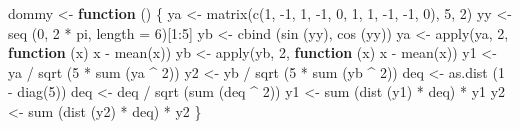 \documentclass[
  12pt,
]{book}
\newenvironment{Shaded}{\begin{snugshade}}{\end{snugshade}}
\newcommand{\AttributeTok}[1]{\textcolor[rgb]{0.77,0.63,0.00}{#1}}
\newcommand{\ControlFlowTok}[1]{\textcolor[rgb]{0.13,0.29,0.53}{\textbf{#1}}}
\newcommand{\DecValTok}[1]{\textcolor[rgb]{0.00,0.00,0.81}{#1}}
\newcommand{\FunctionTok}[1]{\textcolor[rgb]{0.00,0.00,0.00}{#1}}
\newcommand{\NormalTok}[1]{#1}
\newcommand{\OtherTok}[1]{\textcolor[rgb]{0.56,0.35,0.01}{#1}}
\newcommand{\SpecialCharTok}[1]{\textcolor[rgb]{0.00,0.00,0.00}{#1}}
\theoremstyle{definition}
\theoremstyle{definition}
\theoremstyle{definition}
\theoremstyle{definition}
\theoremstyle{remark}
\begin{document}
\begin{Shaded}
\begin{Highlighting}[]
\NormalTok{dommy }\OtherTok{\textless{}{-}} \ControlFlowTok{function}\NormalTok{ () \{}
\NormalTok{  ya }\OtherTok{\textless{}{-}} \FunctionTok{matrix}\NormalTok{(}\FunctionTok{c}\NormalTok{(}\DecValTok{1}\NormalTok{, }\SpecialCharTok{{-}}\DecValTok{1}\NormalTok{, }\DecValTok{1}\NormalTok{, }\SpecialCharTok{{-}}\DecValTok{1}\NormalTok{, }\DecValTok{0}\NormalTok{, }\DecValTok{1}\NormalTok{, }\DecValTok{1}\NormalTok{, }\SpecialCharTok{{-}}\DecValTok{1}\NormalTok{, }\SpecialCharTok{{-}}\DecValTok{1}\NormalTok{, }\DecValTok{0}\NormalTok{), }\DecValTok{5}\NormalTok{, }\DecValTok{2}\NormalTok{)}
\NormalTok{  yy }\OtherTok{\textless{}{-}} \FunctionTok{seq}\NormalTok{ (}\DecValTok{0}\NormalTok{, }\DecValTok{2} \SpecialCharTok{*}\NormalTok{ pi, }\AttributeTok{length =} \DecValTok{6}\NormalTok{)[}\DecValTok{1}\SpecialCharTok{:}\DecValTok{5}\NormalTok{]}
\NormalTok{  yb }\OtherTok{\textless{}{-}} \FunctionTok{cbind}\NormalTok{ (}\FunctionTok{sin}\NormalTok{ (yy), }\FunctionTok{cos}\NormalTok{ (yy))}
\NormalTok{  ya }\OtherTok{\textless{}{-}} \FunctionTok{apply}\NormalTok{(ya, }\DecValTok{2}\NormalTok{, }\ControlFlowTok{function}\NormalTok{ (x)}
\NormalTok{    x }\SpecialCharTok{{-}} \FunctionTok{mean}\NormalTok{(x))}
\NormalTok{  yb }\OtherTok{\textless{}{-}} \FunctionTok{apply}\NormalTok{(yb, }\DecValTok{2}\NormalTok{, }\ControlFlowTok{function}\NormalTok{ (x)}
\NormalTok{    x }\SpecialCharTok{{-}} \FunctionTok{mean}\NormalTok{(x))}
\NormalTok{  y1 }\OtherTok{\textless{}{-}}\NormalTok{ ya }\SpecialCharTok{/} \FunctionTok{sqrt}\NormalTok{ (}\DecValTok{5} \SpecialCharTok{*} \FunctionTok{sum}\NormalTok{ (ya }\SpecialCharTok{\^{}} \DecValTok{2}\NormalTok{))}
\NormalTok{  y2 }\OtherTok{\textless{}{-}}\NormalTok{ yb }\SpecialCharTok{/} \FunctionTok{sqrt}\NormalTok{ (}\DecValTok{5} \SpecialCharTok{*} \FunctionTok{sum}\NormalTok{ (yb }\SpecialCharTok{\^{}} \DecValTok{2}\NormalTok{))}
\NormalTok{  deq }\OtherTok{\textless{}{-}} \FunctionTok{as.dist}\NormalTok{ (}\DecValTok{1} \SpecialCharTok{{-}} \FunctionTok{diag}\NormalTok{(}\DecValTok{5}\NormalTok{))}
\NormalTok{  deq }\OtherTok{\textless{}{-}}\NormalTok{ deq }\SpecialCharTok{/} \FunctionTok{sqrt}\NormalTok{ (}\FunctionTok{sum}\NormalTok{ (deq }\SpecialCharTok{\^{}} \DecValTok{2}\NormalTok{))}
\NormalTok{  y1 }\OtherTok{\textless{}{-}} \FunctionTok{sum}\NormalTok{ (}\FunctionTok{dist}\NormalTok{ (y1) }\SpecialCharTok{*}\NormalTok{ deq) }\SpecialCharTok{*}\NormalTok{ y1}
\NormalTok{  y2 }\OtherTok{\textless{}{-}} \FunctionTok{sum}\NormalTok{ (}\FunctionTok{dist}\NormalTok{ (y2) }\SpecialCharTok{*}\NormalTok{ deq) }\SpecialCharTok{*}\NormalTok{ y2}
\NormalTok{\}}


\end{Highlighting}
\end{Shaded}
\end{document}

